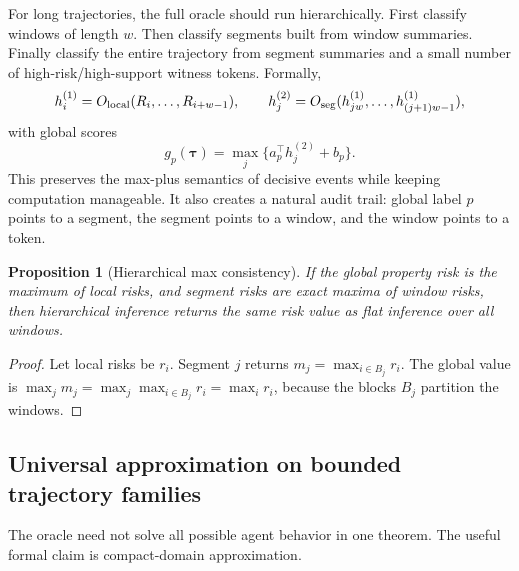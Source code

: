 \documentclass[11pt]{article}
\newtheorem{proposition}[theorem]{Proposition}
\theoremstyle{definition}
\theoremstyle{remark}
\newcommand{\traj}{\boldsymbol{\tau}}
\numberwithin{equation}{section}
\begin{document}
For long trajectories, the full oracle should run hierarchically.  First classify windows of length \(w\).  Then classify segments built from window summaries.  Finally classify the entire trajectory from segment summaries and a small number of high-risk/high-support witness tokens.  Formally,
\begin{equation}
    h_{i}^{(1)}=O_{\rm local}(R_i,\ldots,R_{i+w-1}),\qquad
    h_j^{(2)}=O_{\rm seg}(h_{jw}^{(1)},\ldots,h_{(j+1)w-1}^{(1)}),
\end{equation}
with global scores
\begin{equation}
    g_p(\traj)=\max_j\{a_p^\top h_j^{(2)}+b_p\}.
\end{equation}
This preserves the max-plus semantics of decisive events while keeping computation manageable.  It also creates a natural audit trail: global label \(p\) points to a segment, the segment points to a window, and the window points to a token.

\begin{proposition}[Hierarchical max consistency]
If the global property risk is the maximum of local risks, and segment risks are exact maxima of window risks, then hierarchical inference returns the same risk value as flat inference over all windows.
\end{proposition}
\begin{proof}
Let local risks be \(r_i\).  Segment \(j\) returns \(m_j=\max_{i\in B_j}r_i\).  The global value is \(\max_j m_j=\max_j\max_{i\in B_j}r_i=\max_i r_i\), because the blocks \(B_j\) partition the windows.
\end{proof}

\subsection{Universal approximation on bounded trajectory families}

The oracle need not solve all possible agent behavior in one theorem.  The useful formal claim is compact-domain approximation.
\end{document}
